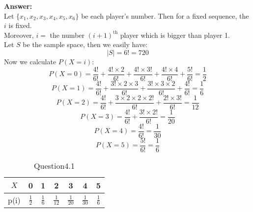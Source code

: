 \documentclass[hidelinks]{article}
\begin{document}
\textbf{\large Answer:}\\
Let $\{x_1,x_2,x_3,x_4,x_5,x_6\}$ be each player's number. Then for a fixed sequence, the $i$ is fixed.\\
Moreover, $i = $ the number $(i+1)^{\text{th}}$ player which is bigger than player 1.\\
Let $S$ be the sample space, then we easily have:
$$ |S| = 6! = 720 $$
Now we calculate $P(X = i)$:
$$ P (X = 0) = \frac{4!}{6!} + \frac{4!\times 2}{6!} + \frac{4! \times 3!}{6!} + \frac{4!\times 4}{6!} + \frac{5!}{6!} = \frac{1}{2}$$
$$ P (X = 1) = \frac{4!}{6!} + \frac{3!\times 2 \times 3}{6!} + \frac{3! \times 3 \times 2}{6!} + \frac{4!}{6!} = \frac{1}{6}$$
$$ P (X = 2) = \frac{4!}{6!} + \frac{3\times 2\times 2\times 2!}{6!} + \frac{2! \times 3!}{6!} = \frac{1}{12}$$
$$ P (X = 3) = \frac{4!}{6!} + \frac{3!\times2!}{6!} = \frac{1}{20}$$
$$ P (X = 4) = \frac{4!}{6!} = \frac{1}{30}$$
$$ P (X = 5) = \frac{5!}{6!} = \frac{1}{6}$$




\begin{table}[H]
    \centering
    \begin{tabular}{|c|c|c|c|c|c|c|}
        \hline
        $X$& 0 & 1 & 2 & 3 & 4 & 5 \\ \hline
        p(i)& $\frac{1}{2}$ & $\frac{1}{6}$ & $\frac{1}{12}$ & $\frac{1}{20}$ & $\frac{1}{30}$ & $\frac{1}{6}$\\ \hline
    \end{tabular}
    \caption{Question4.1}
\end{table}
\end{document}
